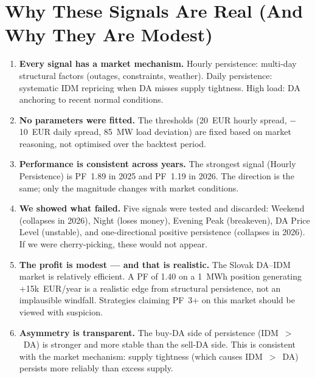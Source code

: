 \documentclass[11pt,a4paper]{article}
\begin{document}
\section{Why These Signals Are Real (And Why They Are Modest)}

\begin{enumerate}[leftmargin=*]
\item \textbf{Every signal has a market mechanism.} Hourly persistence: multi-day structural factors (outages, constraints, weather). Daily persistence: systematic IDM repricing when DA misses supply tightness. High load: DA anchoring to recent normal conditions.

\item \textbf{No parameters were fitted.} The thresholds (20~EUR hourly spread, $-$10~EUR daily spread, 85~MW load deviation) are fixed based on market reasoning, not optimised over the backtest period.

\item \textbf{Performance is consistent across years.} The strongest signal (Hourly Persistence) is PF~1.89 in 2025 and PF~1.19 in 2026. The direction is the same; only the magnitude changes with market conditions.

\item \textbf{We showed what failed.} Five signals were tested and discarded: Weekend (collapses in 2026), Night (loses money), Evening Peak (breakeven), DA Price Level (unstable), and one-directional positive persistence (collapses in 2026). If we were cherry-picking, these would not appear.

\item \textbf{The profit is modest --- and that is realistic.} The Slovak DA--IDM market is relatively efficient. A PF of 1.40 on a 1~MWh position generating +15k~EUR/year is a realistic edge from structural persistence, not an implausible windfall. Strategies claiming PF~3+ on this market should be viewed with suspicion.

\item \textbf{Asymmetry is transparent.} The buy-DA side of persistence (IDM~$>$~DA) is stronger and more stable than the sell-DA side. This is consistent with the market mechanism: supply tightness (which causes IDM~$>$~DA) persists more reliably than excess supply.
\end{enumerate}

\end{document}
